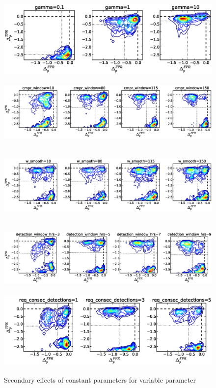 \begin{figure}[!h]
\begin{center}
\includegraphics[height=1.5in]{../fig/final/delta_hist_sec/threshold/gamma}
\includegraphics[height=1.5in]{../fig/final/delta_hist_sec/threshold/cmpr_window}
\includegraphics[height=1.5in]{../fig/final/delta_hist_sec/threshold/w_smooth}
\includegraphics[height=1.5in]{../fig/final/delta_hist_sec/threshold/detection_window_hrs}
\includegraphics[height=1.5in]{../fig/final/delta_hist_sec/threshold/req_consec_detections}
\end{center}
\caption{\label{fig:delta_sec3} Secondary effects of constant parameters for variable parameter }
\end{figure}

